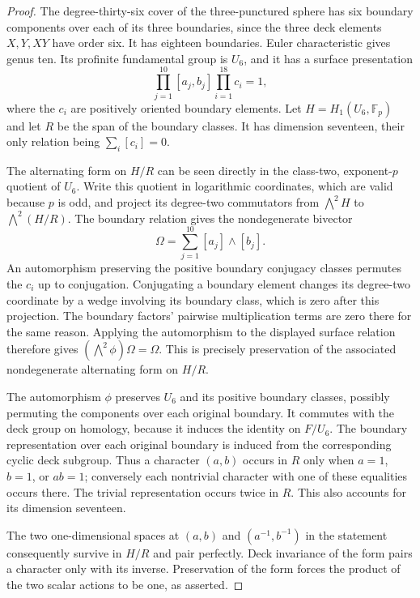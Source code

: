\begin{proof}
The degree-thirty-six cover of the three-punctured sphere has six
boundary components over each of its three boundaries, since the
three deck elements $X,Y,XY$ have order six. It has eighteen
boundaries. Euler characteristic gives genus ten. Its profinite
fundamental group is $U_6$, and it has a surface presentation
\[
 \prod_{j=1}^{10}[a_j,b_j]\prod_{i=1}^{18}c_i=1,
\]
where the $c_i$ are positively oriented boundary elements.
Let $H=H_1(U_6,\mathbb F_p)$ and let $R$ be the span of the
boundary classes. It has dimension seventeen, their only relation
being $\sum_i[c_i]=0$.

The alternating form on $H/R$ can be seen directly in the class-two,
exponent-$p$ quotient of $U_6$. Write this quotient in logarithmic
coordinates, which are valid because $p$ is odd, and project its
degree-two commutators from $\bigwedge^2H$ to
$\bigwedge^2(H/R)$. The boundary relation gives the nondegenerate
bivector
\[
 \Omega=\sum_{j=1}^{10}[a_j]\wedge[b_j].
\]
An automorphism preserving the positive boundary conjugacy classes
permutes the $c_i$ up to conjugation. Conjugating a boundary element
changes its degree-two coordinate by a wedge involving its boundary
class, which is zero after this projection. The boundary factors'
pairwise multiplication terms are zero there for the same reason.
Applying the automorphism to the displayed surface relation therefore
gives $(\bigwedge^2\phi)\Omega=\Omega$. This is precisely preservation
of the associated nondegenerate alternating form on $H/R$.

The automorphism $\phi$ preserves $U_6$ and its positive boundary
classes, possibly permuting the components over each original
boundary. It commutes with the deck group on homology, because it
induces the identity on $F/U_6$. The boundary representation over
each original boundary is induced from the corresponding cyclic
deck subgroup. Thus a character $(a,b)$ occurs in $R$ only when
$a=1$, $b=1$, or $ab=1$; conversely each nontrivial character with
one of these equalities occurs there. The trivial representation
occurs twice in $R$. This also accounts for its dimension seventeen.

The two one-dimensional spaces at $(a,b)$ and $(a^{-1},b^{-1})$
in the statement consequently survive in $H/R$ and pair perfectly.
Deck invariance of the form pairs a character only with its inverse.
Preservation of the form forces the product of the two scalar actions
to be one, as asserted.
\end{proof}

